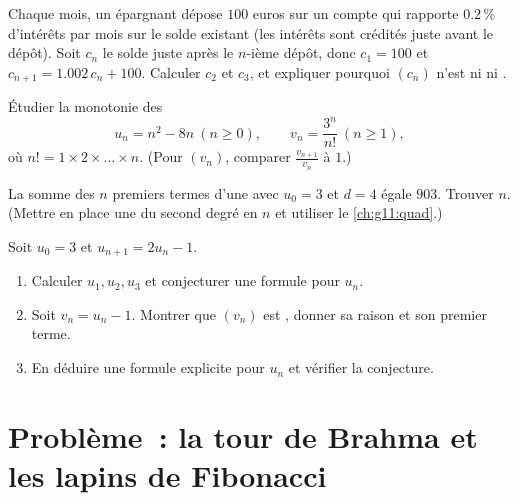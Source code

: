 \begin{exercise}[$\star\star$]\label{exo:g11:seq:8}
Chaque mois, un épargnant dépose $100$ euros sur un compte qui rapporte
$0.2\,\%$ d'intérêts par mois sur le solde existant (les intérêts sont
crédités juste avant le dépôt). Soit $c_n$ le solde juste après le
$n$-ième dépôt, donc $c_1 = 100$ et $c_{n+1} = 1.002\,c_n + 100$.
Calculer $c_2$ et $c_3$, et expliquer pourquoi $(c_n)$ n'est ni
 ni .
\end{exercise}

\begin{exercise}[$\star\star$]\label{exo:g11:seq:9}
Étudier la monotonie des 
\[
u_n = n^2 - 8n \ (n \geq 0), \qquad
v_n = \frac{3^n}{n!}\ (n \geq 1),
\]
où $n! = 1 \times 2 \times \dots \times n$. (Pour $(v_n)$, comparer
$\frac{v_{n+1}}{v_n}$ à $1$.)
\end{exercise}

\begin{exercise}[$\star\star$]\label{exo:g11:seq:10}
La somme des $n$ premiers termes d'une  avec
$u_0 = 3$ et $d = 4$ égale $903$. Trouver $n$. (Mettre en place une
 du second degré en $n$ et utiliser le \cref{ch:g11:quad}.)
\end{exercise}

\begin{exercise}[$\star\star\star$]\label{exo:g11:seq:11}
Soit $u_0 = 3$ et $u_{n+1} = 2u_n - 1$.
\begin{enumerate}
  \item Calculer $u_1, u_2, u_3$ et conjecturer une formule pour $u_n$.
  \item Soit $v_n = u_n - 1$. Montrer que $(v_n)$ est , donner
        sa raison et son premier terme.
  \item En déduire une formule explicite pour $u_n$ et vérifier la
        conjecture.
\end{enumerate}
\end{exercise}

\section{Problème~: la tour de Brahma et les lapins de Fibonacci}

